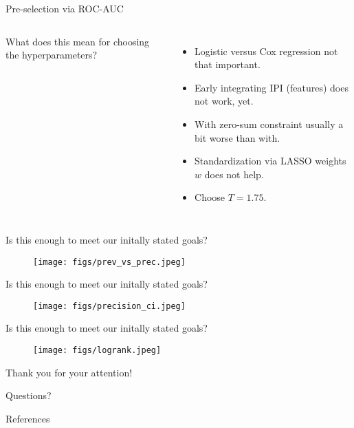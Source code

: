 \documentclass[10pt, aspectratio=169]{beamer}
\begin{document}
\begin{frame}{Pre-selection via ROC-AUC}
  \begin{columns}
    {
      \small
      
    }
      What does this mean for choosing the hyperparameters?
      \begin{itemize}
        \item Logistic versus Cox regression not that important.
        \item Early integrating IPI (features) does not work, yet.
        \item With zero-sum constraint usually a bit worse than with.
        \item Standardization via LASSO weights $w$ does not help.
        \item Choose $T = 1.75$.
      \end{itemize}
  \end{columns}
\end{frame}

\begin{frame}{Is this enough to meet our initally stated goals?}
  \begin{figure}[h]
    \centering
    \texttt{[image: figs/prev\_vs\_prec.jpeg]}
  \end{figure}
\end{frame}

\begin{frame}{Is this enough to meet our initally stated goals?}
  \begin{figure}[h]
    \centering
    \texttt{[image: figs/precision\_ci.jpeg]}
  \end{figure}
\end{frame}

\begin{frame}{Is this enough to meet our initally stated goals?}
  \begin{figure}[h]
    \centering
    \texttt{[image: figs/logrank.jpeg]}
  \end{figure}
\end{frame}

\begin{frame}[standout]
  Thank you for your attention! \par Questions?
\end{frame}

\appendix

\begin{frame}[allowframebreaks]{References}
  \printbibliography
\end{frame}
\end{document}
